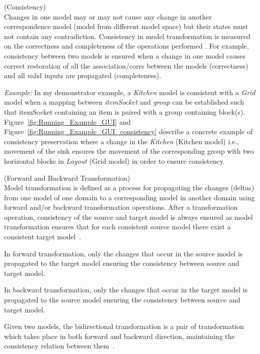 \begin{defn}\label{defConsistency } (Consistency)\\
Changes in one model may or may not cause any change in another correspondence model (model from different model space) but their states must not contain any contradiction. Consistency in model transformation is measured on the correctness and completeness of the operations performed \cite{modelsynchro-tgg}. For example, consistency between two models is ensured when a change in one model causes correct  restoration of all the association/corrs between the models (correctness) and all valid inputs are propagated (completeness).
\end{defn} 

\textit{Example:} In my demonstrator example, a \textit{Kitchen} model is consistent with a \textit{Grid} model when a mapping between \textit{itemSocket} and \textit{group} can be established such that itemSocket containing an item is paired with a group containing block(s). 
Figure~\ref{fig:Running_Example_GUI} and Figure~\ref{fig:Running_Example_GUI_consistency} describe a concrete example of consistency preservation where a change in the \textit{Kitchen} (Kitchen model) i.e., movement of the sink ensures the movement of the corresponding group with two horizontal blocks in \textit{Layout} (Grid model) in order to ensure consistency.

\begin{defn}\label{deffwdbkdtrans} (Forward and Backward Transformation)\\
Model transformation is defined as a process for propagating the changes (deltas) from one model of one domain to a corresponding model in another domain using forward and/or backward transformation operations. After a transformation operation, consistency of the source and target model is always ensured as model transformation ensures that for each consistent source model there exist a consistent target model~\cite{modelsynchro-tgg}.

In forward transformation, only the changes that occur in the source model is propagated to the target model ensuring the consistency between source and target model.

In backward transformation, only the changes that occur in the target model is propagated to the source model ensuring the consistency between source and target model.

Given two models, the bidirectional transformation is a pair of transformation which takes place in both forward and backward direction, maintaining the consistency relation between them~\cite{understanding-bx}.
\end{defn}

